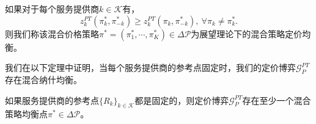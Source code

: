 \begin{df}
如果对于每个服务提供商$k\in\mathcal{K}$有，
\begin{equation}
z_{k}^{PT}(\pi_{k}^*,\pi_{-k}^*)\geq z_{k}^{PT}(\pi_{k},\pi_{-k}^*),~\forall \pi_k\ne\pi_k^*.
\end{equation}
则我们称该混合价格策略$\pi^*=(\pi_{1}^*,\cdots,\pi_{K}^*)\in\Delta\mathcal{P}$为展望理论下的混合策略定价均衡。
\end{df}

我们在以下定理中证明，当每个服务提供商的参考点固定时，我们的定价博弈$\mathcal{G}_{P}^{PT}$存在混合纳什均衡。
\begin{thm}\label{thm:exist2}
如果服务提供商的参考点$\{R_k\}_{k\in\mathcal{K}}$都是固定的，则定价博弈$\mathcal{G}^{PT}_{P}$存在至少一个混合策略均衡点$\pi^{*}\in\Delta\mathcal{P}$。
\end{thm}
